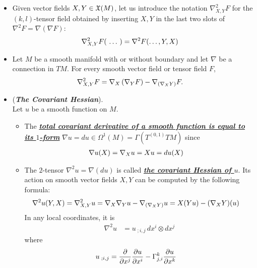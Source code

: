 \documentclass[11pt]{article}
\begin{document}
\begin{itemize}
\item \begin{definition}
Given vector fields $X, Y \in {\mathfrak X}(M)$, let us introduce the notation $\nabla^2_{X, Y}F$ for the $(k,l)$-tensor field obtained by inserting $X,Y$ in the last two slots of $\nabla^2 F= \nabla(\nabla F)$:
\begin{align*}
\nabla^2_{X, Y}F(\,{}\ldots{}\,) &= \nabla^2 F(\ldots, Y, X)
\end{align*}
\end{definition}

\item \begin{proposition}
Let $M$ be a smooth manifold with or without boundary and let $\nabla$ be a connection in $TM$. For every smooth vector field or tensor field $F$,
\begin{align}
\nabla^2_{X, Y}F &= \nabla_{X}\left(\nabla_{Y}F\right) - \nabla_{(\nabla_{X}{Y})}F.  \label{eqn: second_covariant_derivation}
\end{align}
\end{proposition}

\item \begin{example}(\textbf{\emph{The Covariant Hessian}}).\\
Let $u$ be a smooth function on $M$.
\begin{itemize}
\item The \underline{\emph{\textbf{total covariant derivative of a smooth function is equal to its $1$-form}}} $\nabla u = du \in \Omega^1(M) = \Gamma(T^{(0,1)}TM)$ since 
\begin{align*}
\nabla u(X) &= \nabla_{X}{u} = Xu = du(X)
\end{align*}

\item The $2$-tensor $\nabla^2u = \nabla(du)$  is called \underline{\emph{\textbf{the covariant Hessian of $u$}}}. Its action
on smooth vector fields $X,Y$ can be computed by the following formula:
\begin{align}
\nabla^2u(Y, X) = \nabla_{X, Y}^2 u &= \nabla_{X}{\nabla_{Y}{u}} - \nabla_{(\nabla_{X}{Y})}{u} = X(Yu) - (\nabla_{X}{Y})(u)  \label{eqn: covariant_hessian}
\end{align} In any local coordinates, it is
\begin{align*}
\nabla^2u &= u_{\;;i,j}\,dx^i \otimes dx^j
\end{align*} where 
\begin{align*}
u_{\;;i,j} &= \frac{\partial }{ \partial x^j}\frac{\partial u}{ \partial x^i} - \Gamma_{j,i}^{k}\frac{\partial u}{ \partial x^k}
\end{align*}
\end{itemize}
\end{example}
\end{itemize}
\end{document}
